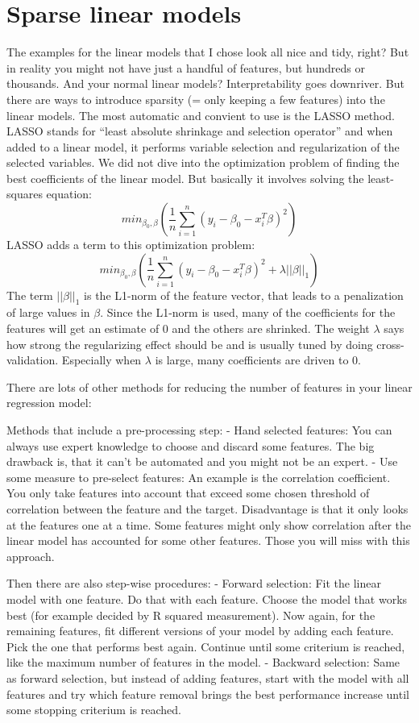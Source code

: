 \documentclass[12pt,]{krantz}
\theoremstyle{definition}
\theoremstyle{definition}
\theoremstyle{definition}
\theoremstyle{remark}
\begin{document}
\section{Sparse linear models}\label{sparse-linear-models}

The examples for the linear models that I chose look all nice and tidy,
right? But in reality you might not have just a handful of features, but
hundreds or thousands. And your normal linear models? Interpretability
goes downriver. But there are ways to introduce sparsity (= only keeping
a few features) into the linear models. The most automatic and convient
to use is the LASSO method. LASSO stands for ``least absolute shrinkage
and selection operator'' and when added to a linear model, it performs
variable selection and regularization of the selected variables. We did
not dive into the optimization problem of finding the best coefficients
of the linear model. But basically it involves solving the least-squares
equation:
\[ min_{\beta_0,\beta} \left( \frac{1}{n} \sum_{i=1}^n (y_i - \beta_0 - x_i^T \beta)^2\right)\]
LASSO adds a term to this optimization problem:
\[ min_{\beta_0,\beta} \left( \frac{1}{n} \sum_{i=1}^n (y_i - \beta_0 - x_i^T \beta)^2 + \lambda ||\beta||_1\right)\]
The term \(||\beta||_1\) is the L1-norm of the feature vector, that
leads to a penalization of large values in \(\beta\). Since the L1-norm
is used, many of the coefficients for the features will get an estimate
of 0 and the others are shrinked. The weight \(\lambda\) says how strong
the regularizing effect should be and is usually tuned by doing
cross-validation. Especially when \(\lambda\) is large, many
coefficients are driven to 0.

There are lots of other methods for reducing the number of features in
your linear regression model:

Methods that include a pre-processing step: - Hand selected features:
You can always use expert knowledge to choose and discard some features.
The big drawback is, that it can't be automated and you might not be an
expert. - Use some measure to pre-select features: An example is the
correlation coefficient. You only take features into account that exceed
some chosen threshold of correlation between the feature and the target.
Disadvantage is that it only looks at the features one at a time. Some
features might only show correlation after the linear model has
accounted for some other features. Those you will miss with this
approach.

Then there are also step-wise procedures: - Forward selection: Fit the
linear model with one feature. Do that with each feature. Choose the
model that works best (for example decided by R squared measurement).
Now again, for the remaining features, fit different versions of your
model by adding each feature. Pick the one that performs best again.
Continue until some criterium is reached, like the maximum number of
features in the model. - Backward selection: Same as forward selection,
but instead of adding features, start with the model with all features
and try which feature removal brings the best performance increase until
some stopping criterium is reached.
\end{document}
